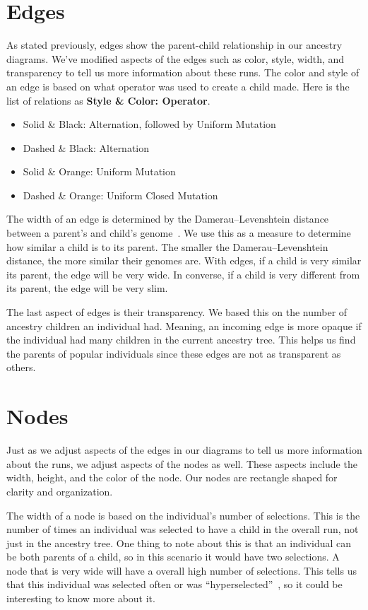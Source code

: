 \documentclass{sig-alternate}
\begin{document}
\section{Edges}
As stated previously, edges show the parent-child relationship in our ancestry diagrams. We've modified aspects of the edges such as color, style, width, and transparency to tell us more information about these runs. The color and style of an edge is based on what operator was used to create a child made. Here is the list of relations as \textbf{Style \& Color: Operator}.
\begin{itemize}
\setlength\itemsep{0em}
\item Solid \& Black: Alternation, followed by Uniform Mutation
\item Dashed \& Black: Alternation
\item Solid \& Orange: Uniform Mutation
\item Dashed \& Orange: Uniform Closed Mutation
\end{itemize}

The width of an edge is determined by the Damerau--Levenshtein distance between a parent's and child's genome~\cite{wiki:DLdist}. We use this as a measure to determine how similar a child is to its parent. The smaller the Damerau--Levenshtein distance, the more similar their genomes are. With edges, if a child is very similar its parent, the edge will be very wide. In converse, if a child is very different from its parent, the edge will be very slim.

The last aspect of edges is their transparency. We based this on the number of ancestry children an individual had. Meaning, an incoming edge is more opaque if the individual had many children in the current ancestry tree. This helps us find the parents of popular individuals since these edges are not as transparent as others.

\section{Nodes}
Just as we adjust aspects of the edges in our diagrams to tell us more information about the runs, we adjust aspects of the nodes as well. These aspects include the width, height, and the color of the node. Our nodes are rectangle shaped for clarity and organization. 

The width of a node is based on the individual's number of selections. This is the number of times an individual was selected to have a child in the overall run, not just in the ancestry tree. One thing to note about this is that an individual can be both parents of a child, so in this scenario it would have two selections. A node that is very wide will have a overall high number of selections. This tells us that this individual was selected often or was ``hyperselected''~\cite{Helmuth:2016:GECCO}, so it could be interesting to know more about it. 
\end{document}
